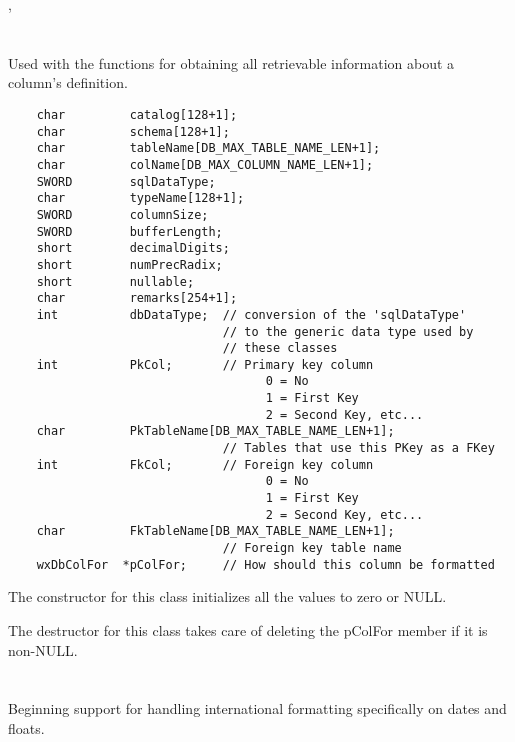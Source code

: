 
, 


\section{}\label{wxdbcolinf}

Used with the  functions for obtaining all retrievable information about a column's definition.

\begin{verbatim}
    char         catalog[128+1];
    char         schema[128+1];
    char         tableName[DB_MAX_TABLE_NAME_LEN+1];
    char         colName[DB_MAX_COLUMN_NAME_LEN+1];
    SWORD        sqlDataType;
    char         typeName[128+1];
    SWORD        columnSize;
    SWORD        bufferLength;
    short        decimalDigits;
    short        numPrecRadix;
    short        nullable;
    char         remarks[254+1];
    int          dbDataType;  // conversion of the 'sqlDataType' 
                              // to the generic data type used by 
                              // these classes
    int          PkCol;       // Primary key column
                                    0 = No
                                    1 = First Key
                                    2 = Second Key, etc...
    char         PkTableName[DB_MAX_TABLE_NAME_LEN+1];
                              // Tables that use this PKey as a FKey
    int          FkCol;       // Foreign key column
                                    0 = No
                                    1 = First Key
                                    2 = Second Key, etc...
    char         FkTableName[DB_MAX_TABLE_NAME_LEN+1]; 
                              // Foreign key table name
    wxDbColFor  *pColFor;     // How should this column be formatted
\end{verbatim}

The constructor for this class initializes all the values to zero or NULL.

The destructor for this class takes care of deleting the pColFor member if 
it is non-NULL.


\section{}\label{wxdbcolfor}

Beginning support for handling international formatting specifically on dates and floats.  

